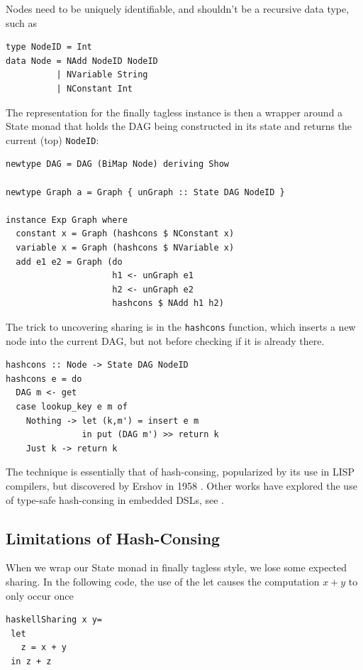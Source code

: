 \documentclass[runningheads]{llncs}
\begin{document}
Nodes need to be uniquely identifiable, and shouldn't be a recursive data type,
such as
\begin{verbatim}
type NodeID = Int
data Node = NAdd NodeID NodeID
          | NVariable String
          | NConstant Int
\end{verbatim}
The representation for the finally tagless
instance is then a wrapper around a State monad that holds the DAG being constructed in its state and
returns the current (top) \texttt{NodeID}:
\begin{verbatim}
newtype DAG = DAG (BiMap Node) deriving Show

newtype Graph a = Graph { unGraph :: State DAG NodeID }

instance Exp Graph where
  constant x = Graph (hashcons $ NConstant x)
  variable x = Graph (hashcons $ NVariable x)
  add e1 e2 = Graph (do
                     h1 <- unGraph e1
                     h2 <- unGraph e2
                     hashcons $ NAdd h1 h2)
\end{verbatim}
The trick to uncovering sharing is in the
\texttt{hashcons} function, which inserts a new node into the current DAG, but not
before checking if it is already there.
\begin{verbatim}
hashcons :: Node -> State DAG NodeID
hashcons e = do
  DAG m <- get
  case lookup_key e m of
    Nothing -> let (k,m') = insert e m
               in put (DAG m') >> return k
    Just k -> return k
\end{verbatim}
The technique is essentially that of
hash-consing, popularized by its use in LISP compilers, but discovered by Ershov in 1958 \cite{ershov1958:consing}. Other works have explored the use
of type-safe hash-consing in embedded DSLs, see \cite{filliatre:typesafeconsing}.

\subsection{Limitations of Hash-Consing} \label{limithashcons}

When we wrap our State monad in finally tagless style, we lose some expected sharing. In the following code, the use of the let causes the computation $x + y$ to only occur once
\begin{verbatim}
haskellSharing x y=
 let
   z = x + y
 in z + z
\end{verbatim}
\end{document}
